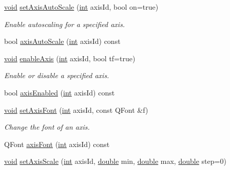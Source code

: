 \begin{DoxyCompactItemize}
\hyperlink{group___u_a_v_objects_plugin_ga444cf2ff3f0ecbe028adce838d373f5c}{void} \hyperlink{class_qwt_plot_a6fb58f90366920f234440fceead50432}{set\-Axis\-Auto\-Scale} (\hyperlink{ioapi_8h_a787fa3cf048117ba7123753c1e74fcd6}{int} axis\-Id, bool on=true)
\begin{DoxyCompactList}\small\item\em Enable autoscaling for a specified axis. \end{DoxyCompactList}\item 
bool \hyperlink{class_qwt_plot_a112a1bc0b4f7132b10bc5b4efae45686}{axis\-Auto\-Scale} (\hyperlink{ioapi_8h_a787fa3cf048117ba7123753c1e74fcd6}{int} axis\-Id) const 
\item 
\hyperlink{group___u_a_v_objects_plugin_ga444cf2ff3f0ecbe028adce838d373f5c}{void} \hyperlink{class_qwt_plot_ab644f7a0a0566ff776c89cc225ce37d7}{enable\-Axis} (\hyperlink{ioapi_8h_a787fa3cf048117ba7123753c1e74fcd6}{int} axis\-Id, bool tf=true)
\begin{DoxyCompactList}\small\item\em Enable or disable a specified axis. \end{DoxyCompactList}\item 
bool \hyperlink{class_qwt_plot_aac5107a1ec8836b53f084a5b1bb8cc43}{axis\-Enabled} (\hyperlink{ioapi_8h_a787fa3cf048117ba7123753c1e74fcd6}{int} axis\-Id) const 
\item 
\hyperlink{group___u_a_v_objects_plugin_ga444cf2ff3f0ecbe028adce838d373f5c}{void} \hyperlink{class_qwt_plot_a9a14e57652c016f40388a68e556917e3}{set\-Axis\-Font} (\hyperlink{ioapi_8h_a787fa3cf048117ba7123753c1e74fcd6}{int} axis\-Id, const Q\-Font \&f)
\begin{DoxyCompactList}\small\item\em Change the font of an axis. \end{DoxyCompactList}\item 
Q\-Font \hyperlink{class_qwt_plot_a637e2261d7722f00b2ce2bacadca8ffa}{axis\-Font} (\hyperlink{ioapi_8h_a787fa3cf048117ba7123753c1e74fcd6}{int} axis\-Id) const 
\item 
\hyperlink{group___u_a_v_objects_plugin_ga444cf2ff3f0ecbe028adce838d373f5c}{void} \hyperlink{class_qwt_plot_acef5ea818944b93b8695d0c16924eed6}{set\-Axis\-Scale} (\hyperlink{ioapi_8h_a787fa3cf048117ba7123753c1e74fcd6}{int} axis\-Id, \hyperlink{_super_l_u_support_8h_a8956b2b9f49bf918deed98379d159ca7}{double} min, \hyperlink{_super_l_u_support_8h_a8956b2b9f49bf918deed98379d159ca7}{double} max, \hyperlink{_super_l_u_support_8h_a8956b2b9f49bf918deed98379d159ca7}{double} step=0)

\end{DoxyCompactItemize}
